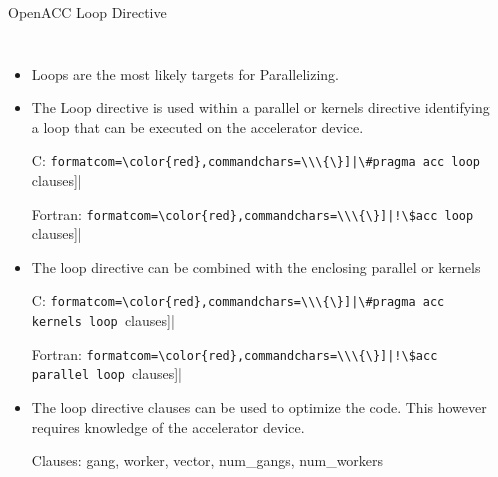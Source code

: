 \documentclass[c,mathserif,compress,xcolor=svgnames]{beamer}
\newcommand{\Verbred}[1]{\Verb[formatcom=\color{red},commandchars=\\\{\}]|#1|}
\newenvironment{eblock}[0]
{
\begin{beamerboxesrounded}[upper=uppercol2,lower=lowercol2,shadow=true]}
{\end{beamerboxesrounded}}
\begin{document}
\begin{frame}[fragile]{\small OpenACC Loop Directive}
  \begin{columns}
    \begin{itemize}
      \item Loops are the most likely targets for Parallelizing.
      \item The Loop directive is used within a parallel or kernels directive identifying a loop that can be executed on the accelerator device.
      \item[C:] \Verbred{\#pragma acc loop [clauses]}
      \item[Fortran:] \Verbred{!\$acc loop [clauses]}
      \item The loop directive can be combined with the enclosing parallel or kernels
      \item[C:] \Verbred{\#pragma acc kernels loop [clauses]}
      \item[Fortran:] \Verbred{!\$acc parallel loop [clauses]}
      \item The loop directive clauses can be used to optimize the code. This however requires knowledge of the accelerator device.
      \item[Clauses:] gang, worker, vector, num\_gangs, num\_workers
    \end{itemize}
    \begin{eblock}{}
      
      
    \end{eblock}
  \end{columns}
\end{frame}
\end{document}
